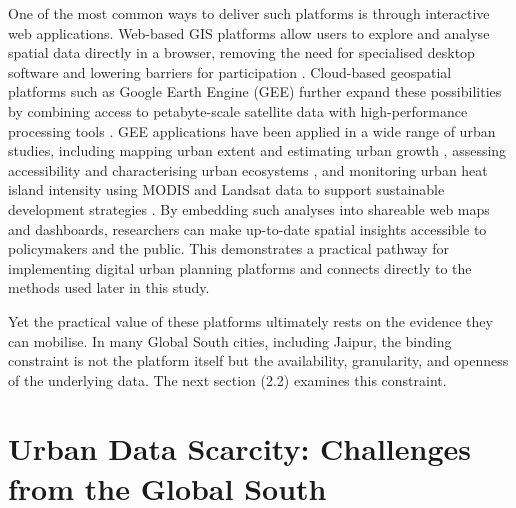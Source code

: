 \documentclass[
  12pt,
  oneside]{book}
\begin{document}
One of the most common ways to deliver such platforms is through interactive web applications. Web-based GIS platforms allow users to explore and analyse spatial data directly in a browser, removing the need for specialised desktop software and lowering barriers for participation \autocite{gebetsroither-geringerINTERACTIVESPATIALWEBAPPLICATIONS2018}. Cloud-based geospatial platforms such as Google Earth Engine (GEE) further expand these possibilities by combining access to petabyte-scale satellite data with high-performance processing tools \autocite{stamouSatelliteImageryComprehensive2025}. GEE applications have been applied in a wide range of urban studies, including mapping urban extent and estimating urban growth \autocite{wangGoogleEarthEngine2021}, assessing accessibility and characterising urban ecosystems \autocite{carvalhoDelimitationUrbanAreas2018}, and monitoring urban heat island intensity using MODIS and Landsat data to support sustainable development strategies \autocite{galodhaLANDSURFACETEMPERATURE2021}. By embedding such analyses into shareable web maps and dashboards, researchers can make up-to-date spatial insights accessible to policymakers and the public. This demonstrates a practical pathway for implementing digital urban planning platforms and connects directly to the methods used later in this study.

Yet the practical value of these platforms ultimately rests on the evidence they can mobilise. In many Global South cities, including Jaipur, the binding constraint is not the platform itself but the availability, granularity, and openness of the underlying data. The next section (2.2) examines this constraint.

\section{Urban Data Scarcity: Challenges from the Global South}\label{urban-data-scarcity-challenges-from-the-global-south}
\end{document}

